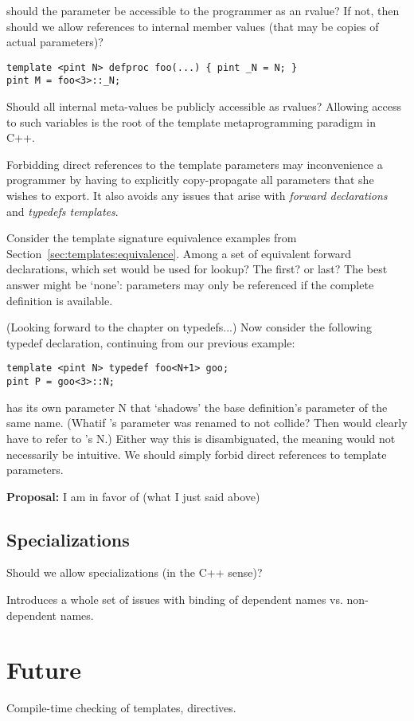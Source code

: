 should the parameter  be accessible to the programmer
as an rvalue?
If not, then should we allow references to internal member values
(that may be copies of actual parameters)?

\begin{verbatim}
template <pint N> defproc foo(...) { pint _N = N; }
pint M = foo<3>::_N;
\end{verbatim}

Should all internal meta-values be publicly accessible as rvalues?
Allowing access to such variables is the root of the template
metaprogramming paradigm in C++.  

Forbidding direct references to the template parameters may 
inconvenience a programmer by having to explicitly copy-propagate
all parameters that she wishes to export.  
It also avoids any issues that arise with \emph{forward declarations}
and \emph{typedefs templates}.  

Consider the template signature equivalence examples from
Section~\ref{sec:templates:equivalence}.  
Among a set of equivalent forward declarations, which set
would be used for lookup?  The first? or last?  
The best answer might be `none': parameters may only be referenced
if the complete definition is available.  

(Looking forward to the chapter on typedefs...)
Now consider the following typedef declaration, continuing from
our previous example:

\begin{verbatim}
template <pint N> typedef foo<N+1> goo;
pint P = goo<3>::N;
\end{verbatim}

 has its own parameter N that `shadows' the base definition's
parameter of the same name.  
(Whatif 's parameter was renamed to not collide?
Then  would clearly have to refer to 's N.)  
Either way this is disambiguated, the meaning would not necessarily be 
intuitive.  
We should simply forbid direct references to template parameters.  

\textbf{Proposal:} I am in favor of (what I just said above)

\subsection{Specializations}
\label{sec:templates:issues:specialization}

Should we allow specializations (in the C++ sense)?

Introduces a whole set of issues with binding of dependent names
vs. non-dependent names.  

\section{Future}
\label{sec:templates:future}

Compile-time checking of templates, directives.  

